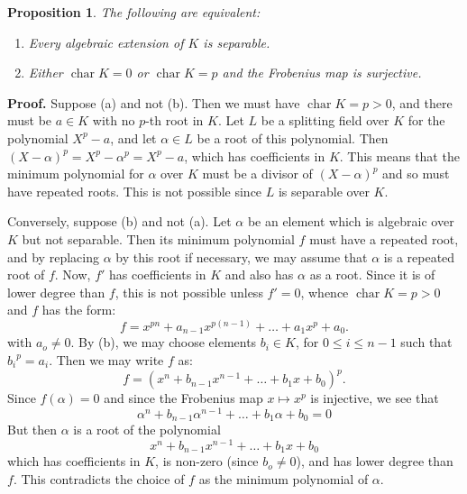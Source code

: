 \documentclass[12pt]{article}
\newtheorem{proposition}{Proposition}
\newcommand{\cchar}{\operatorname{char}}
\begin{document}
\begin{proposition}
The following are equivalent:
\begin{enumerate}
\item[(a)] Every algebraic extension of $K$ is separable.
\item[(b)] Either $\cchar K = 0$ or $\cchar K = p$ and the Frobenius map is surjective.
\end{enumerate}
\end{proposition}

{\bf Proof.}
Suppose (a) and not (b).  Then we must have $\cchar K = p > 0$, and there must be $a \in K$
with no $p$-th root in $K$.  Let $L$ be a splitting field over $K$ for the polynomial $X^p - a$,
and let $\alpha \in L$ be a root of this polynomial.
Then $(X - \alpha)^p = X^p - \alpha^p = X^p - a$, which has coefficients in $K$.
This means that the minimum polynomial for $\alpha$ over $K$ must be a divisor of
$(X - \alpha)^p$ and so must have repeated roots.  This is not possible since $L$ is separable
over $K$.

Conversely, suppose (b) and not (a).
Let $\alpha$ be an element which is algebraic over $K$ but not separable.
Then its minimum polynomial $f$ must have a repeated root, and by replacing $\alpha$ by this
root if necessary, we may assume that $\alpha$ is a repeated root of $f$.
Now, $f'$ has coefficients in $K$ and also has $\alpha$ as a root.  Since it is of lower
degree than $f$, this is not possible unless $f' = 0$,
whence $\cchar K = p > 0$ and $f$ has the form:
$$f = x^{pn} + a_{n-1}x^{p(n-1)} + \dots + a_1 x^p + a_0.$$
with $a_o \neq 0$.
By (b), we may choose elements $b_i \in K$, for $0 \le i \le n-1$ such that ${b_i}^p = a_i$.
Then we may write $f$ as:
$$f = ( x^n + b_{n-1} x^{n-1} + \dots + b_1 x  + b_0)^p.$$
Since $f(\alpha) = 0$ and since the Frobenius map $x \mapsto x^p$ is injective, we see that
$$\alpha^n + b_{n-1} \alpha^{n-1} + \dots + b_1 \alpha + b_0 = 0$$
But then $\alpha$ is a root of the polynomial
$$x^n + b_{n-1} x^{n-1} + \dots + b_1 x  + b_0$$
which has coefficients in $K$, is non-zero (since $b_o \neq 0$), and has lower degree than $f$.
This contradicts the choice of $f$ as the minimum polynomial of $\alpha$.
\end{document}
